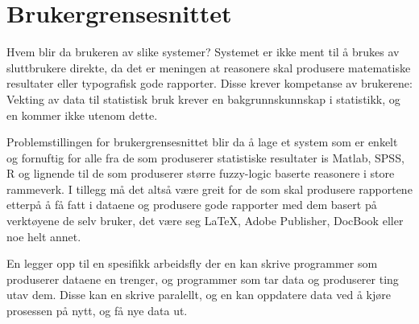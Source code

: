 \documentclass[11pt]{article}
\begin{document}
\section{Brukergrensesnittet}
Hvem blir da brukeren av slike systemer?
Systemet er ikke ment til å brukes av sluttbrukere direkte, da det er meningen at reasonere skal produsere matematiske resultater eller typografisk gode rapporter. Disse krever kompetanse av brukerene: Vekting av data til statistisk bruk krever en bakgrunnskunnskap i statistikk, og en kommer ikke utenom dette.

Problemstillingen for brukergrensesnittet blir da å lage et system som er enkelt og fornuftig for alle fra de som produserer statistiske resultater is Matlab, SPSS, R og lignende til de som produserer større fuzzy-logic baserte reasonere i store rammeverk. I tillegg må det altså være greit for de som skal produsere rapportene etterpå å få fatt i dataene og produsere gode rapporter med dem basert på verktøyene de selv bruker, det være seg LaTeX, Adobe Publisher, DocBook eller noe helt annet.

En legger opp til en spesifikk arbeidsfly der en kan skrive programmer som produserer dataene en trenger, og programmer som tar data og produserer ting utav dem. Disse kan en skrive paralellt, og en kan oppdatere data ved å kjøre prosessen på nytt, og få nye data ut.
\end{document}
